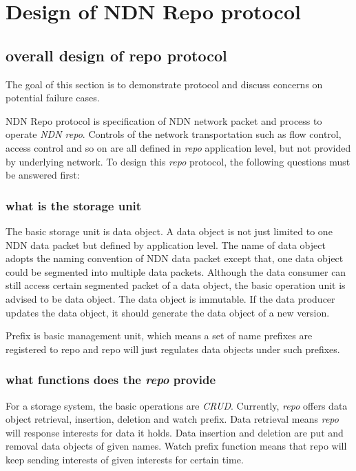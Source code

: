 \documentclass[conference]{IEEEtran}
\begin{document}
\section{Design of NDN Repo protocol} \label{section-design}

\subsection{overall design of repo protocol}

The goal of this section is to demonstrate protocol and discuss concerns on potential failure cases.

NDN Repo protocol is specification of NDN network packet and process to operate \emph{NDN repo}. Controls of the network transportation such as flow control, access control and so on are all defined in \emph{repo} application level, but not provided by underlying network. To design this \emph{repo} protocol, the following questions must be answered first:

\subsubsection{what is the storage unit}

The basic storage unit is data object. A data object is not just limited to one NDN data packet but defined by application level. The name of data object adopts the naming convention of NDN data packet except that, one data object could be segmented into multiple data packets. Although the data consumer can still access certain segmented packet of a data object, the basic operation unit is advised to be data object. The data object is immutable. If the data producer updates the data object, it should generate the data object of a new version.

Prefix is basic management unit, which means a set of name prefixes are registered to repo and repo will just regulates data objects under such prefixes.

\subsubsection{what functions does the \emph{repo} provide}

For a storage system, the basic operations are \emph{CRUD}. Currently, \emph{repo} offers data object retrieval, insertion, deletion and watch prefix. Data retrieval means \emph{repo} will response interests for data it holds. Data insertion and deletion are put and removal data objects of given names. Watch prefix function means that repo will keep sending interests of given interests for certain time.
\end{document}
